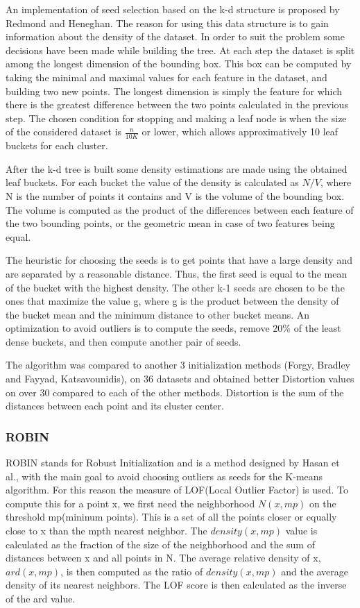 \documentclass[12pt]{article}
\begin{document}
	An implementation of seed selection based on the k-d structure is proposed by Redmond and Heneghan\cite{KdTreeKmeans}. The reason for using this data structure is to gain information about the density of the dataset. In order to suit the problem some decisions have been made while building the tree. At each step the dataset is split among the longest dimension of the bounding box. This box can be computed by taking the minimal and maximal values for each feature in the dataset, and building two new points. The longest dimension is simply the feature for which there is the greatest difference between the two points calculated in the previous step. The chosen condition for stopping and making a leaf node is when the size of the considered dataset is \(\frac{n}{10K}\) or lower, which allows approximatively 10 leaf buckets for each cluster.
	
	After the k-d tree is built some density estimations are made using the obtained leaf buckets. For each bucket the value of the density is calculated as \( N / V \), where N is the number of points it contains and V is the volume of the bounding box. The volume is computed as the product of the differences between each feature of the two bounding points, or the geometric mean in case of two features being equal. 
	
	The heuristic for choosing the seeds is to get points that have a large density and are separated by a reasonable distance. Thus, the first seed is equal to the mean of the bucket with the highest density. The other k-1 seeds are chosen to be the ones that maximize the value g, where g is the product between the density of the bucket mean and the minimum distance to other bucket means. An optimization to avoid outliers is to compute the seeds, remove 20\% of the least dense buckets, and then compute another pair of seeds.
	
	The algorithm was compared to another 3 initialization methods (Forgy, Bradley and Fayyad, Katsavounidis), on 36 datasets and obtained better Distortion values on over 30 compared to each of the other methods. Distortion is the sum of the distances between each point and its cluster center.
	
	\subsubsection{ROBIN}
	ROBIN stands for Robust Initialization and is a method designed by Hasan et al.\cite{ROBIN}, with the main goal to avoid choosing outliers as seeds for the K-means algorithm. For this reason the measure of LOF(Local Outlier Factor) is used. To compute this for a point x, we first need the neighborhood \(N(x, mp)\) on the threshold mp(mininum points). This is a set of all the points closer or equally close to x than the mpth nearest neighbor. The \(density(x, mp)\) value is calculated as the fraction of the size of the neighborhood and the sum of distances between x and all points in N. The average relative density of x, \(ard(x, mp)\), is then computed as the ratio of \(density(x, mp)\) and the average density of its nearest neighbors. The LOF score is then calculated as the inverse of the ard value. 
	
\end{document}

